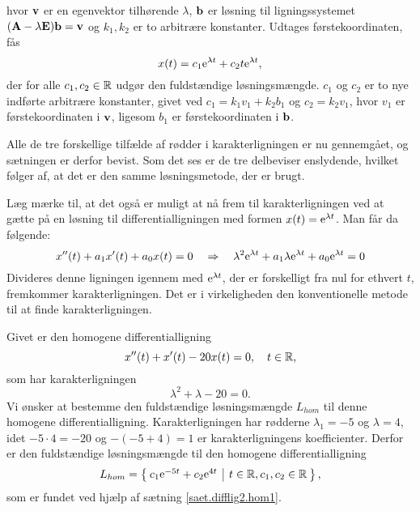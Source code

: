 \begin{bevis}
\begin{equation}
\end{equation}
hvor $ \mathbf{v} $ er en egenvektor tilhørende $ \lambda $, $ \mathbf{b} $ er løsning til ligningssystemet $ (\mathbf{A} - \lambda \mathbf{E})\mathbf{b} = \mathbf{v} $ og $ k_1,k_2 $ er to arbitrære konstanter. Udtages førstekoordinaten, fås
\begin{equation}
x(t) = c_1 \mathrm{e}^{\lambda t} + c_2 t \mathrm{e}^{\lambda t},
\end{equation}
der for alle $ c_1,c_2 \in \mathbb{R} $ udgør den fuldstændige løsningsmængde. $ c_1 $ og $ c_2 $ er to nye indførte arbitrære konstanter, givet ved $ c_1 = k_1 v_1 + k_2 b_1 $ og $ c_2 = k_2 v_1 $, hvor $ v_1 $ er førstekoordinaten i $ \mathbf{v} $, ligesom $ b_1 $ er førstekoordinaten i $ \mathbf{b} $.

Alle de tre forskellige tilfælde af rødder i karakterligningen er nu gennemgået, og sætningen er derfor bevist. Som det ses er de tre delbeviser enslydende, hvilket følger af, at det er den samme løsningsmetode, der er brugt.

\begin{info}
Læg mærke til, at det også er muligt at nå frem til karakterligningen ved at gætte på en løsning til differentialligningen med formen $ x(t) = \mathrm{e}^{\lambda t} $. Man får da følgende:
\begin{equation}
x''(t) + a_1x'(t) + a_0x(t) = 0 \quad \Rightarrow \quad \lambda^2 \mathrm{e}^{\lambda t} + a_1 \lambda \mathrm{e}^{\lambda t} + a_0 \mathrm{e}^{\lambda t} = 0
\end{equation}
Divideres denne ligningen igennem med $ \mathrm{e}^{\lambda t} $, der er forskelligt fra nul for ethvert $ t $, fremkommer karakterligningen. Det er i virkeligheden den konventionelle metode til at finde karakterligningen.
\end{info}

\end{bevis}

\begin{example} \label{eks.difflig2.hom11}
Givet er den homogene differentialligning
\begin{equation}
x''(t) + x'(t) - 20x(t) = 0, \quad t \in \mathbb{R},
\end{equation}
som har karakterligningen
\begin{equation}
\lambda^2 + \lambda - 20 = 0.
\end{equation}
Vi ønsker at bestemme den fuldstændige løsningsmængde $ L_{hom} $ til denne homogene differentialligning. \bs
Karakterligningen har rødderne $ \lambda_1 = -5 $ og $ \lambda = 4 $, idet $ -5 \cdot 4 = -20 $ og $ -(-5+4) = 1 $ er karakterligningens koefficienter. Derfor er den fuldstændige løsningsmængde til den homogene differentialligning
\begin{equation}
L_{hom} = \left\lbrace \hspace*{-1mm} \begin{array}{c|c} c_1 \mathrm{e}^{-5 t} + c_2 \mathrm{e}^{4 t} & t \in \mathbb{R}, c_1,c_2 \in \mathbb{R} \end{array} \hspace*{-1mm} \right\rbrace,
\end{equation}
som er fundet ved hjælp af sætning \ref{saet.difflig2.hom1}.
\end{example}

